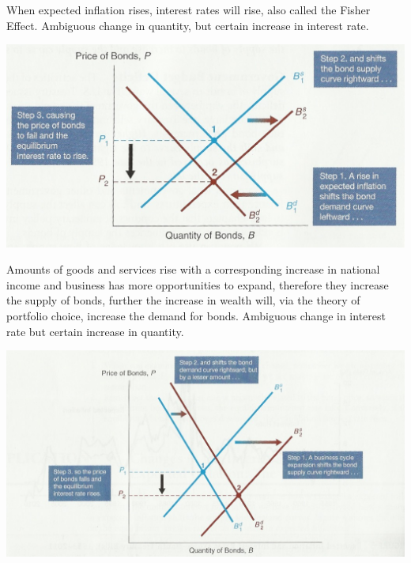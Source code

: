 \documentclass[12pt]{examnotes}
\begin{document}
When expected inflation rises, interest rates will rise, also called the Fisher Effect. Ambiguous change in quantity, but certain increase in interest rate.
\begin{center}
  \includegraphics[scale=0.4]{./imgs/changeexpecteinflation.jpg}
\end{center}
Amounts of goods and services rise with a corresponding increase in national income and business has more opportunities to expand, therefore they increase the supply of bonds, further the increase in wealth will, via the theory of portfolio choice, increase the demand for bonds. Ambiguous change in interest rate but certain increase in quantity.
\begin{center}
  \includegraphics[scale=0.4]{./imgs/fig6.jpg}
\end{center}
\end{document}
